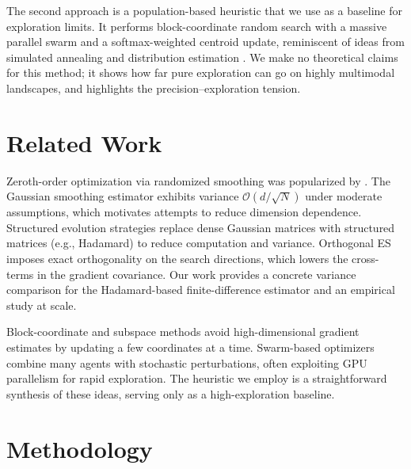 \documentclass[11pt,a4paper]{article}
\begin{document}
The second approach is a population-based heuristic that we use as a baseline for exploration limits. It performs block-coordinate random search with a massive parallel swarm and a softmax-weighted centroid update, reminiscent of ideas from simulated annealing \citep{kirkpatrick1983optimization} and distribution estimation \citep{hansen2016cma}. We make no theoretical claims for this method; it shows how far pure exploration can go on highly multimodal landscapes, and highlights the precision–exploration tension.

\section{Related Work}
Zeroth-order optimization via randomized smoothing was popularized by \citet{nesterov2017random}. The Gaussian smoothing estimator exhibits variance $\mathcal{O}(d/\sqrt{N})$ under moderate assumptions, which motivates attempts to reduce dimension dependence. Structured evolution strategies \citep{choromanski2018structured} replace dense Gaussian matrices with structured matrices (e.g., Hadamard) to reduce computation and variance. Orthogonal ES \citep{choromanski2018structured,maheswaranathan2018guided} imposes exact orthogonality on the search directions, which lowers the cross-terms in the gradient covariance. Our work provides a concrete variance comparison for the Hadamard-based finite-difference estimator and an empirical study at scale.

Block-coordinate and subspace methods \citep{wang2016randomized} avoid high-dimensional gradient estimates by updating a few coordinates at a time. Swarm-based optimizers \citep{kennedy1995particle} combine many agents with stochastic perturbations, often exploiting GPU parallelism for rapid exploration. The heuristic we employ is a straightforward synthesis of these ideas, serving only as a high-exploration baseline.

\section{Methodology}
\end{document}
